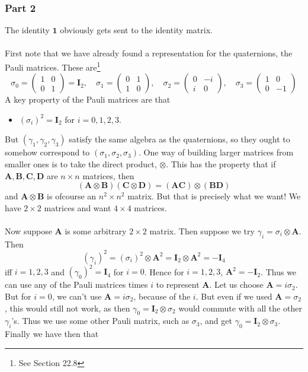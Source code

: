 \subsubsection*{Part 2}
The identity $\mathbf{1}$ obviously gets sent to the identity matrix. \\ \\ First note that we have already found a representation for the quaternions, the Pauli matrices. These are\footnote{See Section 22.8} 
$$\sigma_0=
\begin{pmatrix} 
1&0 \\
0&1
\end{pmatrix}=\mathbf{I}_2,\quad \sigma_1=\begin{pmatrix} 
0&1 \\
1&0
\end{pmatrix},\quad \sigma_2=\begin{pmatrix} 
0&-i \\
i&0
\end{pmatrix},\quad \sigma_3=\begin{pmatrix} 
1&0 \\
0&-1
\end{pmatrix}$$
A key property of the Pauli matrices are that
\begin{itemize}
\item $(\sigma_i)^2=\mathbf{I}_2$ for $i=0,1,2,3$.
\end{itemize}
But $(\gamma_1,\gamma_2,\gamma_3)$ satisfy the same algebra as the quaternions, so they ought to somehow correspond to $(\sigma_1,\sigma_2,\sigma_3)$. One way of building larger matrices from smaller ones is to take the direct product, $\otimes$. This has the property that if $\mathbf{A},\mathbf{B},\mathbf{C},\mathbf{D}$ are $n\times n$ matrices, then $$(\mathbf{A}\otimes\mathbf{B})(\mathbf{C}\otimes\mathbf{D})=(\mathbf{A}\mathbf{C})\otimes(\mathbf{B}\mathbf{D})$$ and $\mathbf{A}\otimes\mathbf{B}$ is ofcourse an $n^2\times n^2$ matrix. But that is precisely what we want! We have $2\times 2$ matrices and want $4\times 4$ matrices.\\ \\ Now suppose $\mathbf{A}$ is some arbitrary $2\times 2$ matrix. Then suppose we try $\gamma_i=\sigma_i\otimes \mathbf{A}$. Then $$(\gamma_i)^2=(\sigma_i)^2\otimes \mathbf{A}^2=\mathbf{I}_2\otimes \mathbf{A}^2=-\mathbf{I}_4$$ iff $i=1,2,3$ and $(\gamma_0)^2=\mathbf{I}_4$ for $i=0$. Hence for $i=1,2,3$, $\mathbf{A}^2=-\mathbf{I}_2$. Thus we can use any of the Pauli matrices times $i$ to represent $\mathbf{A}$. Let us choose $\mathbf{A}=i\sigma_2$. But for $i=0$, we can't use $\mathbf{A}=i\sigma_2$, because of the $i$. But even if we used $\mathbf{A}=\sigma_2$, this would still not work, as then $\gamma_0=\mathbf{I}_2\otimes \sigma_2$ would commute with all the other $\gamma_i$'s. Thus we use some other Pauli matrix, such as $\sigma_3$, and get $\gamma_0=\mathbf{I}_2\otimes \sigma_3$. Finally we have then that 
